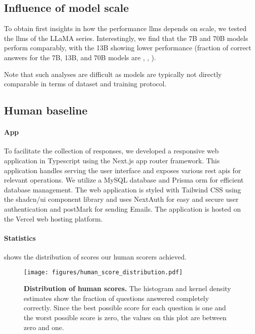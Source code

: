 \subsection{Influence of model scale}
To obtain first insights in how the performance \glspl{llm} depends on scale, we tested the \glspl{llm} of the LLaMA series. 
Interestingly, we find that the 7B and 70B models perform comparably, with the 13B showing lower performance (fraction of correct answers for the 7B, 13B, and 70B models are , , ).

Note that such analyses are difficult as models are typically not directly comparable in terms of dataset and training protocol.\autocite{biderman2023pythia}

\subsection{Human baseline}
\paragraph{App} To facilitate the collection of responses, we developed a responsive web application in Typescript using the Next.js\autocite{nextjs} app router framework.
This application handles serving the user interface and exposes various \gls{rest} \glspl{api} for relevant operations.
We utilize a MySQL\autocite{mysql} database and Prisma \gls{orm}\autocite{prisma} for efficient database management.
The web application is styled with Tailwind CSS\autocite{tailwindcss} using the shadcn/ui component library and uses NextAuth\autocite{nextauth} for easy and secure user authentication and postMark for sending Emails.
The application is hosted on the Vercel web hosting platform.


\paragraph{Statistics}
 shows the distribution of scores our human scorers achieved.

\begin{figure}[htb]
    \centering
    \texttt{[image: figures/human\_score\_distribution.pdf]}
    \caption{\textbf{Distribution of human scores.} The histogram and kernel density estimates show the fraction of questions answered completely correctly.
    Since the best possible score for each question is one and the worst possible score is zero, the values on this plot are between zero and one.}
    \label{fig:human_score_distribution}
\end{figure}

